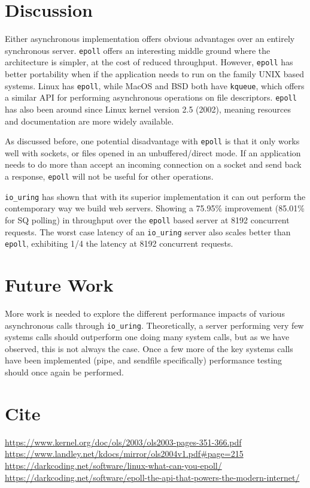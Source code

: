 \documentclass[letterpaper, 10pt, twocolumn]{article}
\begin{document}
\section{Discussion}
\label{sec:org2f02670}
Either asynchronous implementation offers obvious advantages over an entirely synchronous server. \texttt{epoll} offers an interesting middle ground where the architecture is simpler, at the cost of reduced throughput. However, \texttt{epoll} has better portability when if the application needs to run on the family UNIX based systems. Linux has \texttt{epoll}, while MacOS and BSD both have \texttt{kqueue}, which offers a similar API for performing asynchronous operations on file descriptors. \texttt{epoll} has also been around since Linux kernel version 2.5 (2002), meaning resources and documentation are more widely available.

As discussed before, one potential disadvantage with \texttt{epoll} is that it only works well with sockets, or files opened in an unbuffered/direct mode. If an application needs to do more than accept an incoming connection on a socket and send back a response, \texttt{epoll} will not be useful for other operations.

\texttt{io\_uring} has shown that with its superior implementation it can out perform the contemporary way we build web servers. Showing a 75.95\% improvement (85.01\% for SQ polling) in throughput over the \texttt{epoll} based server at 8192 concurrent requests. The worst case latency of an \texttt{io\_uring} server also scales better than \texttt{epoll}, exhibiting 1/4 the latency at 8192 concurrent requests.

\section{Future Work}
\label{sec:orgf9cc5a0}
More work is needed to explore the different performance impacts of various asynchronous calls through \texttt{io\_uring}. Theoretically, a server performing very few systems calls should outperform one doing many system calls, but as we have observed, this is not always the case. Once a few more of the key systems calls have been implemented (pipe, and sendfile specifically) performance testing should once again be performed.


\section{Cite}
\label{sec:org896d969}
\url{https://www.kernel.org/doc/ols/2003/ols2003-pages-351-366.pdf}
\url{https://www.landley.net/kdocs/mirror/ols2004v1.pdf\#page=215}
\url{https://darkcoding.net/software/linux-what-can-you-epoll/}
\url{https://darkcoding.net/software/epoll-the-api-that-powers-the-modern-internet/}
\end{document}
